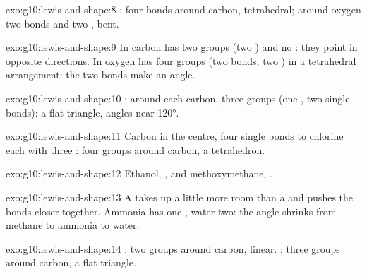 \begin{solution}{exo:g10:lewis-and-shape:8}
: four bonds around carbon,
tetrahedral; around oxygen two bonds and two , bent.
\end{solution}

\begin{solution}{exo:g10:lewis-and-shape:9}
In  carbon has two groups (two ) and no : they
point in opposite directions. In  oxygen has four groups (two
bonds, two ) in a tetrahedral arrangement: the two bonds make an
angle.
\end{solution}

\begin{solution}{exo:g10:lewis-and-shape:10}
: around each carbon, three
groups (one , two single bonds): a flat triangle, angles near
\ang{120}.
\end{solution}

\begin{solution}{exo:g10:lewis-and-shape:11}
Carbon in the centre, four single bonds to chlorine  each with three
: four groups around carbon, a tetrahedron.
\end{solution}

\begin{solution}{exo:g10:lewis-and-shape:12}
Ethanol, , and
methoxymethane,
.
\end{solution}

\begin{solution}{exo:g10:lewis-and-shape:13}
A  takes up a little more room than a  and pushes the
bonds closer together. Ammonia has one , water two: the angle
shrinks from methane to ammonia to water.
\end{solution}

\begin{solution}{exo:g10:lewis-and-shape:14}
: two groups around carbon, linear.
: three groups around carbon, a flat
triangle.
\end{solution}

